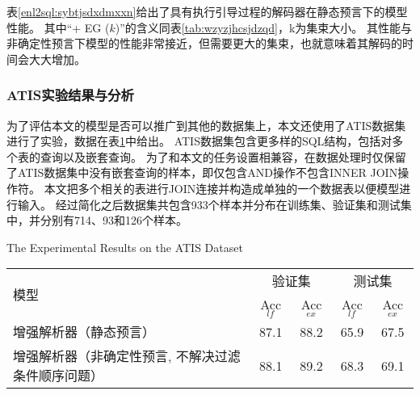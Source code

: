 表\ref{enl2sql:sybtjsdxdmxxn}给出了具有执行引导过程的解码器在静态预言下的模型性能。
其中“+ EG ($k$)”的含义同表\ref{tab:wzyzjhcsjdzqd}，k为集束大小。
其性能与非确定性预言下模型的性能非常接近，但需要更大的集束，也就意味着其解码的时间会大大增加。

\subsubsection{ATIS实验结果与分析}
为了评估本文的模型是否可以推广到其他的数据集上，本文还使用了ATIS数据集进行了实验，数据在表\ref{tab:asjjsdsyjg}中给出。
ATIS数据集包含更多样的SQL结构，包括对多个表的查询以及嵌套查询。
为了和本文的任务设置相兼容，在数据处理时仅保留了ATIS数据集中没有嵌套查询的样本，即仅包含AND操作不包含INNER JOIN操作符。
本文把多个相关的表进行JOIN连接并构造成单独的一个数据表以便模型进行输入。
经过简化之后数据集共包含933个样本并分布在训练集、验证集和测试集中，并分别有714、93和126个样本。

\begin{table}[!htpb]
    {The Experimental Results on the ATIS Dataset}
  \label{tab:asjjsdsyjg}
  \centering
  \begin{threeparttable}[b]
     \begin{tabular}{lcccc}
      \toprule
      \multirow{2}{10mm}{模型}&\multicolumn{2}{c}{验证集} & \multicolumn{2}{c}{测试集}\\
      \cmidrule(lr){2-3}\cmidrule(lr){4-5}
      & Acc$_{lf}$ & Acc$_{ex}$ & Acc$_{lf}$ & Acc$_{ex}$\\
      \midrule
      增强解析器（静态预言） & 87.1 & 88.2 & 65.9 & 67.5\\
      增强解析器（非确定性预言, 不解决过滤条件顺序问题） & 88.1 & 89.2 & 68.3 & 69.1\\
      \bottomrule
    \end{tabular}
  \end{threeparttable}
\end{table}

